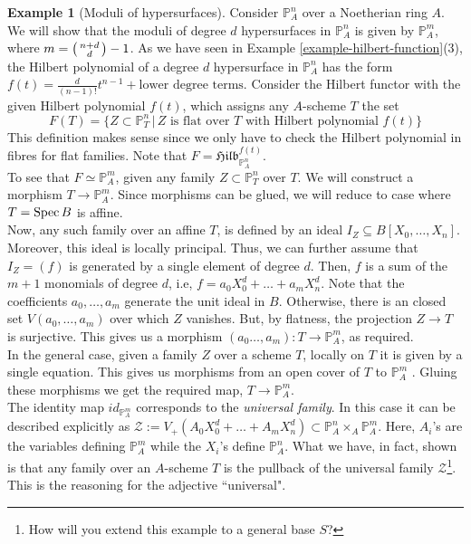 \documentclass[11pt]{amsart}
\newcommand{\Spec}{{\rm Spec \,}}
\newcommand{\sZ}{{\mathcal Z}}
\renewcommand{\P}{{\mathbb P}}
\theoremstyle{definition}
\newtheorem{example}[theorem]{Example}
\begin{document}
\begin{example}[Moduli of hypersurfaces]
	Consider $\P^n_A$ over a Noetherian ring $A$. We will show that the moduli of degree $d$ hypersurfaces in $\P^n_A$ is given by $\P^m_A$, where 
	$m = \begin{psmallmatrix}
	n + d\\
	d
	\end{psmallmatrix} -1$. As we have seen in Example \ref{example-hilbert-function}(3), the Hilbert polynomial of a degree $d$ hypersurface in $\P^n_A$ has the form $f(t)=\frac{d}{(n-1)!}t^{n-1}+\text{lower degree terms}$. Consider the Hilbert functor with the given Hilbert polynomial $f(t)$, which assigns any $A$-scheme $T$ the set
	\begin{equation*}
	F(T)=\{ Z\subset \P^n_T \, | \, \text{$Z$ is flat over $T$ with Hilbert polynomial $f(t)$}\}
	\end{equation*}
	This definition makes sense since we only have to check the Hilbert polynomial in fibres for flat families. Note that $F=\mathfrak{Hilb}^{f(t)}_{\P^n_A}$.\\
	To see that $F\simeq \P^m_A$, given any family $Z\subset \P^n_T$ over $T$. We will construct a morphism $T\rightarrow\P^m_A$. Since morphisms can be glued, we will reduce to case where $T=\Spec B$ is affine.\\
	Now, any such family over an affine $T$, is defined by an ideal $I_Z\subseteq B[X_0,\ldots,X_n]$. Moreover, this ideal is locally principal. Thus, we can further assume that $I_Z = (f)$ is generated by a single element of degree $d$. Then, $f$ is a sum of the $m+1$ monomials of degree $d$, i.e, $f=a_0 X^d_0+\ldots+a_m X^d_n$. Note that the coefficients $a_0,\ldots,a_m$ generate the unit ideal in $B$. Otherwise, there is an closed set $V(a_0,\ldots,a_m)$ over which $Z$ vanishes. But, by flatness, the projection $Z\rightarrow T$ is surjective. This gives us a morphism $(a_0\ldots,a_m): T\rightarrow \P^m_A$, as required.\\
	In the general case, given a family $Z$ over a scheme $T$, locally on $T$ it is given by a single equation. This gives us morphisms from an open cover of $T$ to $\P^m_A$ . Gluing these morphisms we get the required map, $T\rightarrow \P^m_A$.\\
	The identity map $id_{\P^m_A}$ corresponds to the \textit{universal family}. In this case it can be described explicitly as $\sZ:=V_+(A_0 X_0^d+\ldots + A_m X_n^d)\subset \P^n_A\times_A \P^m_A$. Here, $A_i$'s are the variables defining $\P^m_A$ while the $X_i$'s define $\P^n_A$. What we have, in fact, shown is that any family over an $A$-scheme $T$ is the pullback of the universal family $\sZ$\footnote{How will you extend this example to a general base $S$?}. This is the reasoning for the adjective ``universal".
\end{example}
\end{document}
